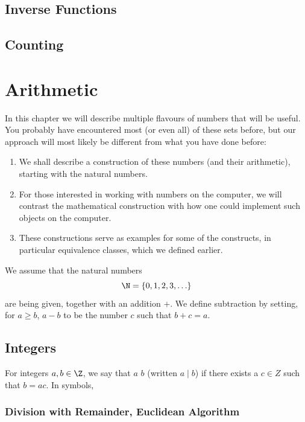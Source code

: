 \section{Inverse Functions}

\section{Counting}

\chapter{Arithmetic}

In this chapter we will describe multiple flavours of numbers that will be
useful. You probably have encountered most (or even all) of these sets
before, but our approach will most likely be different from what you have
done before:
\begin{enumerate}
\item We shall describe a construction of these numbers (and their
arithmetic), starting with the natural numbers.
\item For those interested in working with numbers on the computer, we will
contrast the mathematical construction with how one could implement such
objects on the computer.
\item
These constructions serve as examples for some of the constructs, in
particular equivalence classes, which we defined earlier.
\end{enumerate}

We assume that the natural numbers
\[
\N=\{0,1,2,3,\ldots\}
\]
are being given, together with an addition $+$. We define subtraction by
setting, for $a\ge b$, $a-b$ to be the number $c$ such that
$b+c=a$.

\section{Integers}


\begin{defn}
For integers $a,b\in\Z$, we say that $a$  $b$ (written
$a\mid b$) if there
exists a $c\in Z$ such that $b=ac$. In symbols, 
\end{defn}

\subsection{Division with Remainder, Euclidean Algorithm}

